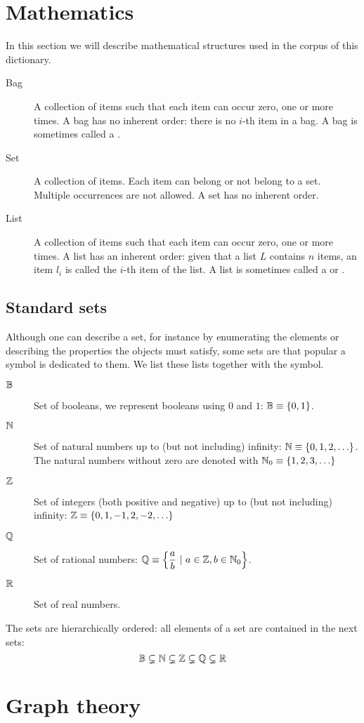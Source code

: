 \clearpage{}
\appendix
\section{Mathematics}
In this section we will describe mathematical structures used in the corpus of this dictionary.
\begin{description}
 \item [Bag] A collection of items such that each item can occur zero, one or more times. A bag has no inherent order: there is no $i$-th item in a bag. A bag is sometimes called a .
 \item [Set] A collection of items. Each item can belong or not belong to a set. Multiple occurrences are not allowed. A set has no inherent order.
 \item [List] A collection of items such that each item can occur zero, one or more times. A list has an inherent order: given that a list $L$ contains $n$ items, an item $l_i$ is called the $i$-th item of the list. A list is sometimes called a  or .
\end{description}
\subsection{Standard sets}
Although one can describe a set, for instance by enumerating the elements or describing the properties the objects must satisfy, some sets are that popular a symbol is dedicated to them. We list these lists together with the symbol.
\begin{description}
 \item [$\mathbb{B}$] Set of booleans, we represent booleans using $0$ and $1$: $\mathbb{B}\equiv\left\{ 0,1 \right\}$.
 \item [$\mathbb{N}$] Set of natural numbers up to (but not including) infinity: $\mathbb{N}\equiv\left\{ 0,1,2,\ldots \right\}$. The natural numbers without zero are denoted with $\mathbb{N}_0\equiv\left\{ 1,2,3,\ldots \right\}$
 \item [$\mathbb{Z}$] Set of integers (both positive and negative) up to (but not including) infinity: $\mathbb{Z}\equiv\left\{ 0,1,-1,2,-2,\ldots \right\}$
 \item [$\mathbb{Q}$] Set of rational numbers: $\mathbb{Q}\equiv\left\{ \dfrac{a}{b}\ |\ a\in\mathbb{Z},b\in\mathbb{N}_0 \right\}$.
 \item [$\mathbb{R}$] Set of real numbers.
\end{description}
The sets are hierarchically ordered: all elements of a set are contained in the next sets:
\[
\mathbb{B}\subsetneq\mathbb{N}\subsetneq\mathbb{Z}\subsetneq\mathbb{Q}\subsetneq\mathbb{R}
\]
\section{Graph theory}
